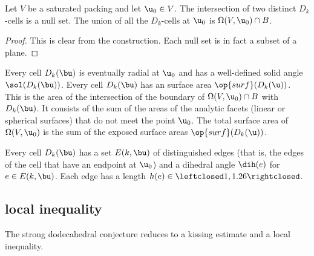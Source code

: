 \begin{lemma}[]
  Let $V$ be a saturated packing and let $\u_0\in V$.  The
  intersection of two distinct $D_k$-cells is a null set.  The union
  of all the $D_k$-cells at $\u_0$ is $\Omega(V, \u_0)\cap B$.
\end{lemma}
%

\begin{proof} This is clear from the construction.  Each null set is
  in fact a subset of a plane.
\end{proof}

Every cell $D_k(\bu)$ is eventually radial at $ \u_0$ and has a
well-defined solid angle $\sol(D_k(\bu))$.  Every cell $D_k(\bu)$ has
an  surface area $\op{surf}(D_k(\u))$.  This is the area
of the intersection of the boundary of $\Omega(V, \u_0)\cap B$ with
$D_k(\bu)$.  It consists of the sum of the areas of the analytic
facets (linear or spherical surfaces) that do not meet the point $
\u_0$.  The total surface area of $\Omega(V,\u_0)$ is the sum of the
exposed surface areas $\op{surf}(D_k(\u))$.  %
%
%
%


Every cell $D_k(\bu)$ has a set $E(k,\bu)$ of distinguished edges
(that is, the edges of the cell that have an endpoint at $\u_0$) and a
dihedral angle $\dih(e)$ for $e\in E(k,\bu)$.  Each edge has a length
$h(e)\in\leftclosed1,1.26\rightclosed$.  %
%
%
%

\subsection{local inequality}

The strong dodecahedral conjecture reduces to a kissing estimate and a
local inequality.  %


